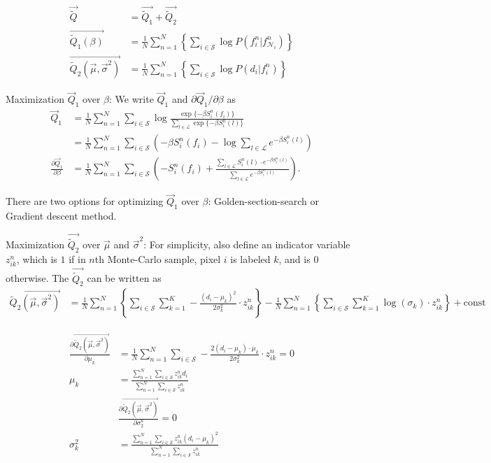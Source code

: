 \documentclass[12pt]{article}
\begin{document}
\begin{align*}
  \vec {\widetilde Q} &= \vec {\widetilde Q_1} + \vec {\widetilde Q_2} \\
  \vec {\widetilde Q_1 (\beta)} &= \frac{1}{N}\sum_{n=1}^N \left \{ \sum_{i \in \mathcal{S}} \log P(f_i^n | f^n_{\mathcal{N}_i})\right \} \\
  \vec {\widetilde Q_2(\vec \mu, \vec \sigma^2)} &= \frac{1}{N}\sum_{n=1}^N \left \{  \sum_{i \in \mathcal{S}} \log P(d_i | f_i^n) \right \}
\end{align*}


Maximization $\vec Q_1$ over $\beta$: We write $\vec Q_1$ and $\partial \vec Q_1 / \partial \beta$ as 
\begin{align*}
  \vec Q_1 &= \frac{1}{N}\sum_{n = 1}^{N} \sum_{i \in \mathcal{S}}^{} \log \frac{\exp \{ -\beta S_i^n(f_i)\}}{\sum_{l \in \mathcal{L}} \exp \{ -\beta S_i^n(l) \}} \\
  &= \frac{1}{N}\sum_{n = 1}^{N} \sum_{i \in \mathcal{S}}^{} \left (-\beta S_i^n(f_i) - \log \sum_{l \in \mathcal{L}} e^{ -\beta S_i^n(l)} \right) \\
  \frac{\partial \vec Q_1}{\partial \beta} &= \frac{1}{N}\sum_{n = 1}^{N} \sum_{i \in \mathcal{S}}^{} \left ( -S_i^n(f_i) + \frac{\sum_{l \in \mathcal{L}} S_i^n(l) \cdot e^{ -\beta S_i^n(l)}}{\sum_{l \in \mathcal{L}} e^{ -\beta S_i^n(l)}} \right ).
\end{align*}

There are two options for optimizing $\vec Q_1$ over $\beta$: Golden-section-search or Gradient descent method. 


Maximization  $\vec {\widetilde Q_2}$ over $\vec \mu$ and $\vec \sigma^2$: 
For simplicity, also define an indicator variable $z_{ik}^n$, which is $1$ if in $n$th Monte-Carlo sample, pixel $i$ is labeled $k$, and is $0$ otherwise. The $\vec {\widetilde Q_2}$ can be written as
\begin{align*}
  \vec {\widetilde Q_2(\vec \mu, \vec \sigma^2)} &= \frac{1}{N}\sum_{n=1}^N \left \{  \sum_{i \in \mathcal{S}} \sum_{k = 1}^{K} -\frac{(d_i - \mu_k)^2}{2\sigma_k^2} \cdot z_{ik}^n\right \} - \frac{1}{N}\sum_{n=1}^N \left \{  \sum_{i \in \mathcal{S}} \sum_{k = 1}^{K} \log(\sigma_k) \cdot z_{ik}^n \right \} + \mathrm{const}
\end{align*}

\begin{align*}
  \frac{\partial  \vec {\widetilde Q_2(\vec \mu, \vec \sigma^2)}}{\partial \mu_k} &= \frac{1}{N}\sum_{n=1}^N  \sum_{i \in \mathcal{S}} -\frac{2(d_i- \mu_k) \cdot \mu_k}{2\sigma_k^2} \cdot z_{ik}^n = 0\\
  \mu_k &= \frac{\sum_{n=1}^N  \sum_{i \in \mathcal{S}} z_{ik}^n d_i}{\sum_{n=1}^N  \sum_{i \in \mathcal{S}}  z_{ik}^n}\\
  &\frac{\partial  \vec {\widetilde Q_2(\vec \mu, \vec \sigma^2)}}{\partial \sigma_2^k} = 0 \\
  \sigma_k^2 &= \frac{\sum_{n=1}^N  \sum_{i \in \mathcal{S}} z_{ik}^n (d_i - \mu_k)^2}{\sum_{n=1}^N  \sum_{i \in \mathcal{S}}  z_{ik}^n}\\
\end{align*}
\end{document}
